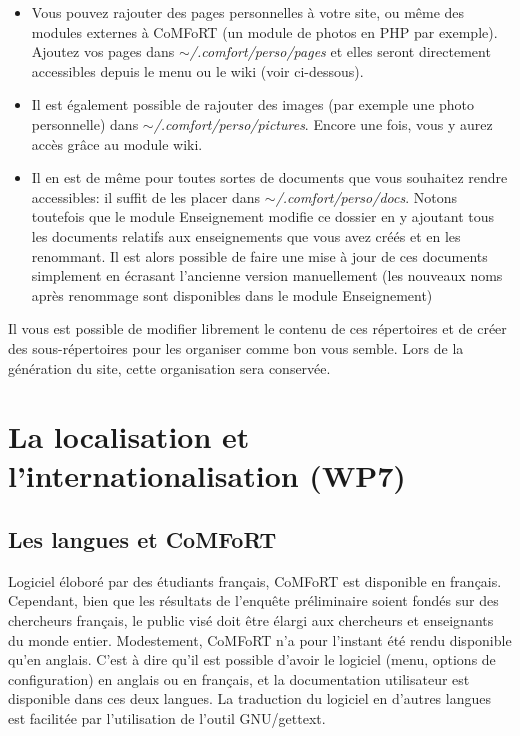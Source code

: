 \documentclass[final,11pt,a4paper,twoside,titlepage]{article}
\newcommand{\p}{\vspace{0.3em}}
\begin{document}
{    \begin{itemize}
      \item Vous pouvez rajouter des pages personnelles à votre site, ou même
        des modules externes à CoMFoRT (un module de photos en PHP par exemple).
        Ajoutez vos pages dans \emph{$\sim$/.comfort/perso/pages} et elles seront
        directement accessibles depuis le menu ou le wiki (voir ci-dessous).\p
      \item Il est également possible de rajouter des images
        (par exemple une photo personnelle) dans 
        \emph{$\sim$/.comfort/perso/pictures}. Encore une fois, vous y aurez accès
        grâce au module wiki. \p
      \item Il en est de même pour toutes sortes de documents que vous souhaitez
        rendre accessibles: il suffit de les placer dans 
        \emph{$\sim$/.comfort/perso/docs}. Notons toutefois que le module
        Enseignement modifie ce dossier en y ajoutant tous les documents
        relatifs aux enseignements que vous avez créés et en les renommant.
        Il est alors possible de faire une mise à jour de ces documents 
        simplement en écrasant l'ancienne version manuellement (les nouveaux 
        noms après renommage sont disponibles dans le module Enseignement)
    \end{itemize}    \p
    Il vous est possible de modifier librement le contenu de ces répertoires
    et de créer des sous-répertoires pour les organiser comme bon vous semble.
    Lors de la génération du site, cette organisation sera conservée.

  \section{La localisation et l'internationalisation (WP7)}

    \subsection{Les langues et CoMFoRT}
    Logiciel éloboré par des étudiants français, CoMFoRT est disponible
    en français. Cependant, bien que les résultats de l'enquête
    préliminaire soient fondés sur des chercheurs français, le public
    visé doit être élargi aux chercheurs et enseignants du monde
    entier. Modestement, CoMFoRT n'a pour l'instant été rendu disponible
    qu'en anglais. C'est à dire qu'il est possible d'avoir le logiciel
    (menu, options de configuration) en anglais ou en français, et la
    documentation utilisateur est disponible dans ces deux langues. La
    traduction du logiciel en d'autres langues est facilitée par l'utilisation
    de l'outil GNU/gettext.

}
\end{document}
